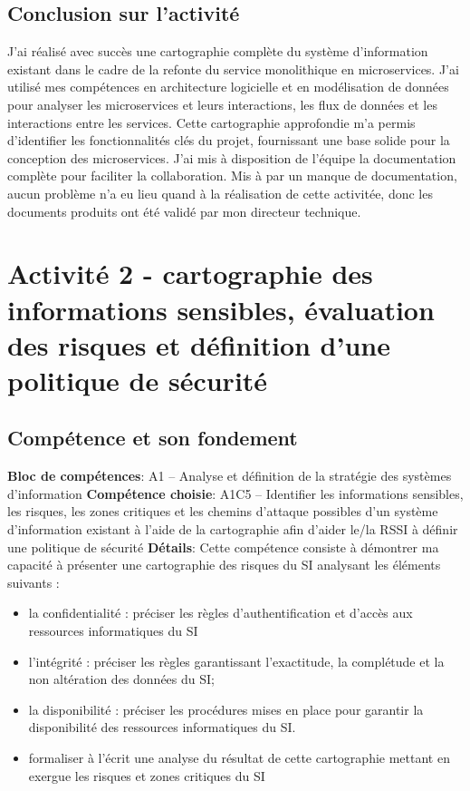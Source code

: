 \documentclass[a4paper, 11pt]{report}
\begin{document}
\subsection{Conclusion sur l'activité}
J'ai réalisé avec succès une cartographie complète du système d'information existant dans le cadre de la refonte du service monolithique en microservices.
J'ai utilisé mes compétences en architecture logicielle et en modélisation de données pour analyser les microservices et leurs interactions, les flux de données et les interactions entre les services.
Cette cartographie approfondie m'a permis d'identifier les fonctionnalités clés du projet, fournissant une base solide pour la conception des microservices.
J'ai mis à disposition de l'équipe la documentation complète pour faciliter la collaboration.
Mis à par un manque de documentation, aucun problème n'a eu lieu quand à la réalisation de cette activitée, donc les documents produits ont été validé par mon directeur technique.

\section{Activité 2 - cartographie des informations sensibles, évaluation des risques et définition d'une politique de sécurité}
\subsection{Compétence et son fondement}
\textbf{Bloc de compétences}: A1 – Analyse et définition de la stratégie des systèmes d’information
\newline
\textbf{Compétence choisie}: A1C5 – Identifier les informations sensibles, les risques, les zones critiques et les chemins d’attaque possibles d’un système d’information existant à l’aide de la cartographie afin d’aider le/la RSSI à définir une politique de sécurité
\textbf{Détails}: Cette compétence consiste à démontrer ma capacité à présenter une cartographie des risques du SI analysant les éléments suivants :
\begin{itemize}
  \item la confidentialité : préciser les règles d’authentification et d’accès aux ressources informatiques du SI
  \item l’intégrité : préciser les règles garantissant l’exactitude, la complétude et la non altération des données du SI;
  \item la disponibilité : préciser les procédures mises en place pour garantir la disponibilité des ressources informatiques du SI.
  \item formaliser à l’écrit une analyse du résultat de cette cartographie mettant en exergue les risques et zones critiques du SI
\end{itemize}
\end{document}
